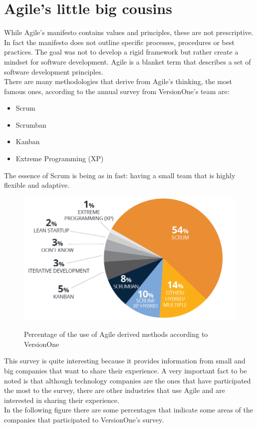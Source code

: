 \section{Agile's little big cousins}
	While Agile's manifesto contains values and principles, these are not prescriptive.
	In fact the manifesto does not outline specific processes, procedures or best practices.
	The goal was not to develop a rigid framework but rather create a mindset for software development.
	Agile is a blanket term that describes a set of software development principles.\\
	There are many methodologies that derive from Agile's thinking, the most famous ones, according to the annual survey\cite{state-of-agile} from VersionOne's team are:
	\begin{itemize}
		\item Scrum
		\item Scrumban
		\item Kanban
		\item Extreme Programming (XP)
	\end{itemize}
	The essence of Scrum is being  as in fast: having a small team that is highly flexible and adaptive.
	\begin{figure}[H]
		\centering
		\includegraphics[width=.8\textwidth]{resources/agile-usage-chart}\\
		\caption{Percentage of the use of Agile derived methods according to VersionOne}
	\end{figure}
	This survey is quite interesting because it provides information from small and big companies that want to share their experience.
	A very important fact to be noted is that although technology companies are the ones that have participated the most to the survey, there are other industries that use Agile and are interested in sharing their experience.\\
	In the following figure there are some percentages that indicate some areas of the companies that participated to VersionOne's survey.
